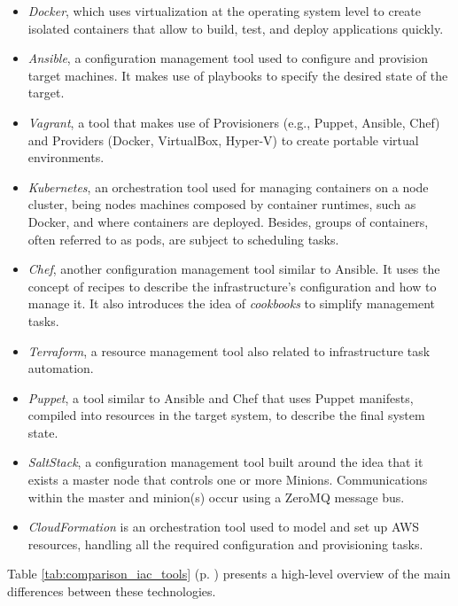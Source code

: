 \begin{itemize}
    \item \textit{Docker}, which uses virtualization at the operating system level to create isolated containers that allow to build, test, and deploy applications quickly. 
    \item \textit{Ansible}, a configuration management tool used to configure and provision target machines. It makes use of playbooks to specify the desired state of the target. 
    \item \textit{Vagrant}, a tool that makes use of Provisioners (e.g., Puppet, Ansible, Chef) and Providers (Docker, VirtualBox, Hyper-V) to create portable virtual environments. 
    \item \textit{Kubernetes}, an orchestration tool used for managing containers on a node cluster, being nodes machines composed by container runtimes, such as Docker, and where containers are deployed. Besides, groups of containers, often referred to as pods, are subject to scheduling tasks.
    \item \textit{Chef}, another configuration management tool similar to Ansible. It uses the concept of recipes to describe the infrastructure's configuration and how to manage it. It also introduces the idea of \textit{cookbooks} to simplify management tasks.
    \item \textit{Terraform}, a resource management tool also related to infrastructure task automation.
    \item \textit{Puppet}, a tool similar to Ansible and Chef that uses Puppet manifests, compiled into resources in the target system, to describe the final system state.
    \item \textit{SaltStack}, a configuration management tool built around the idea that it exists a master node that controls one or more Minions. Communications within the master and minion(s) occur using a ZeroMQ message bus.
    \item \textit{CloudFormation} is an orchestration tool used to model and set up AWS resources, handling all the required configuration and provisioning tasks.
\end{itemize}

Table \ref{tab:comparison_iac_tools} (p. \pageref{tab:comparison_iac_tools}) presents a high-level overview of the main differences between these technologies.

